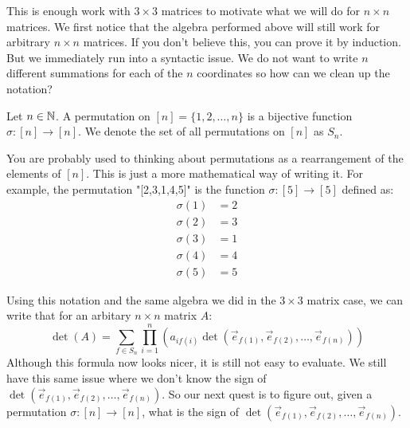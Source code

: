 This is enough work with $3\times 3$ matrices to motivate what we will do for $n\times n$ matrices. We first notice that the algebra performed above will still work for arbitrary $n\times n$ matrices. If you don't believe this, you can prove it by induction. But we immediately run into a syntactic issue. We do not want to write $n$ different summations for each of the $n$ coordinates so how can we clean up the notation?
\begin{definition}
    Let $n\in\mathbb{N}$. A permutation on $[n]=\{1,2,\dots,n\}$ is a bijective function $\sigma:[n]\to [n]$. We denote the set of all permutations on $[n]$ as $S_n$.
\end{definition}
\begin{remark}
    You are probably used to thinking about permutations as a rearrangement of the elements of $[n]$. This is just a more mathematical way of writing it. For example, the permutation "[2,3,1,4,5]" is the function $\sigma:[5]\to[5]$ defined as:
    \begin{align*}
        \sigma(1)&=2\\
        \sigma(2)&=3\\
        \sigma(3)&=1\\
        \sigma(4)&=4\\
        \sigma(5)&=5
    \end{align*}
\end{remark}
Using this notation and the same algebra we did in the $3\times 3$ matrix case, we can write that for an arbitary $n\times n$ matrix $A$:
$$\det(A)=\sum_{f\in S_n}\prod_{i=1}^n\left(a_{if(i)}\det(\vec{e}_{f(1)},\vec{e}_{f(2)},\dots,\vec{e}_{f(n)})\right)$$
Although this formula now looks nicer, it is still not easy to evaluate. We still have this same issue where we don't know the sign of $\det(\vec{e}_{f(1)},\vec{e}_{f(2)},\dots,\vec{e}_{f(n)})$. So our next quest is to figure out, given a permutation $\sigma:[n]\to[n]$, what is the sign of $\det(\vec{e}_{f(1)},\vec{e}_{f(2)},\dots,\vec{e}_{f(n)})$.
